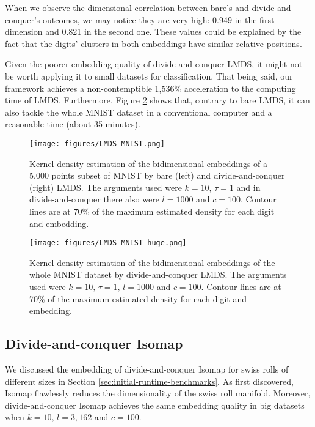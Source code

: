 When we observe the dimensional correlation between bare's and divide-and-conquer's outcomes, we may notice they are very high: 0.949 in the first dimension and 0.821 in the second one. These values could be explained by the fact that the digits' clusters in both embeddings have similar relative positions.

Given the poorer embedding quality of divide-and-conquer LMDS, it might not be worth applying it to small datasets for classification. That being said, our framework achieves a non-contemptible 1,536\% acceleration to the computing time of LMDS. Furthermore, Figure \ref{fig:LMDS-MNIST-huge} shows that, contrary to bare LMDS, it can also tackle the whole MNIST dataset in a conventional computer and a reasonable time (about 35 minutes).

\begin{figure}
    \centering
    \texttt{[image: figures/LMDS-MNIST.png]}
    \caption{Kernel density estimation of the bidimensional embeddings of a 5,000 points subset of MNIST by bare (left) and divide-and-conquer (right) LMDS. The arguments used were $k=10,\, \tau = 1$ and in divide-and-conquer there also were $l=1000$ and $c=100$. Contour lines are at 70\% of the maximum estimated density for each digit and embedding.}
    \label{fig:LMDS-MNIST}
\end{figure}

\begin{figure}
    \centering
    \texttt{[image: figures/LMDS-MNIST-huge.png]}
    \caption{Kernel density estimation of the bidimensional embeddings of the whole MNIST dataset by divide-and-conquer LMDS. The arguments used were $k=10,\, \tau = 1, \, l=1000$ and $c=100$. Contour lines are at 70\% of the maximum estimated density for each digit and embedding.}
    \label{fig:LMDS-MNIST-huge}
\end{figure}

\subsection{Divide-and-conquer Isomap}
\label{sec:dc-Isomap}

We discussed the embedding of divide-and-conquer Isomap for swiss rolls of different sizes in Section \ref{sec:initial-runtime-benchmarks}. As \citet{Spiwokv2007} first discovered, Isomap flawlessly reduces the dimensionality of the swiss roll manifold. Moreover, divide-and-conquer Isomap achieves the same embedding quality in big datasets when $k=10,\, l=3,162$ and $c=100$.

